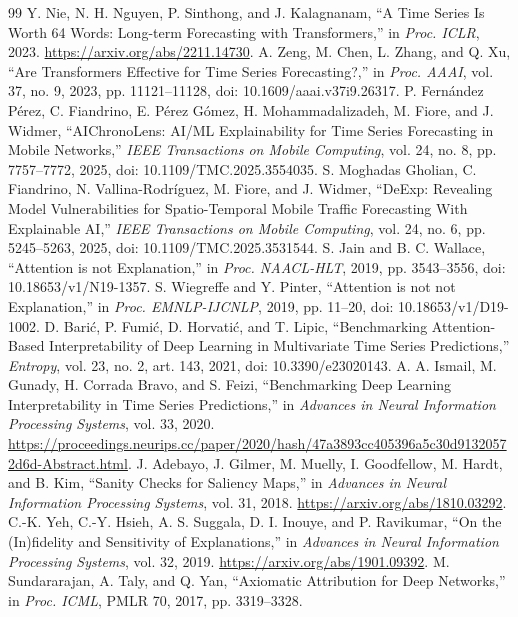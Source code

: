 \documentclass[conference]{IEEEtran}
\begin{document}
\begin{thebibliography}{99}
 Y. Nie, N. H. Nguyen, P. Sinthong, and J. Kalagnanam, ``A Time Series Is Worth 64 Words: Long-term Forecasting with Transformers,'' in \emph{Proc. ICLR}, 2023. \url{https://arxiv.org/abs/2211.14730}.
 A. Zeng, M. Chen, L. Zhang, and Q. Xu, ``Are Transformers Effective for Time Series Forecasting?,'' in \emph{Proc. AAAI}, vol. 37, no. 9, 2023, pp. 11121--11128, doi: 10.1609/aaai.v37i9.26317.
 P. Fern\'andez P\'erez, C. Fiandrino, E. P\'erez G\'omez, H. Mohammadalizadeh, M. Fiore, and J. Widmer, ``AIChronoLens: AI/ML Explainability for Time Series Forecasting in Mobile Networks,'' \emph{IEEE Transactions on Mobile Computing}, vol. 24, no. 8, pp. 7757--7772, 2025, doi: 10.1109/TMC.2025.3554035.
 S. Moghadas Gholian, C. Fiandrino, N. Vallina-Rodr\'iguez, M. Fiore, and J. Widmer, ``DeExp: Revealing Model Vulnerabilities for Spatio-Temporal Mobile Traffic Forecasting With Explainable AI,'' \emph{IEEE Transactions on Mobile Computing}, vol. 24, no. 6, pp. 5245--5263, 2025, doi: 10.1109/TMC.2025.3531544.
 S. Jain and B. C. Wallace, ``Attention is not Explanation,'' in \emph{Proc. NAACL-HLT}, 2019, pp. 3543--3556, doi: 10.18653/v1/N19-1357.
 S. Wiegreffe and Y. Pinter, ``Attention is not not Explanation,'' in \emph{Proc. EMNLP-IJCNLP}, 2019, pp. 11--20, doi: 10.18653/v1/D19-1002.
 D. Bari\'c, P. Fumi\'c, D. Horvati\'c, and T. Lipic, ``Benchmarking Attention-Based Interpretability of Deep Learning in Multivariate Time Series Predictions,'' \emph{Entropy}, vol. 23, no. 2, art. 143, 2021, doi: 10.3390/e23020143.
 A. A. Ismail, M. Gunady, H. Corrada Bravo, and S. Feizi, ``Benchmarking Deep Learning Interpretability in Time Series Predictions,'' in \emph{Advances in Neural Information Processing Systems}, vol. 33, 2020. \url{https://proceedings.neurips.cc/paper/2020/hash/47a3893cc405396a5c30d91320572d6d-Abstract.html}.
 J. Adebayo, J. Gilmer, M. Muelly, I. Goodfellow, M. Hardt, and B. Kim, ``Sanity Checks for Saliency Maps,'' in \emph{Advances in Neural Information Processing Systems}, vol. 31, 2018. \url{https://arxiv.org/abs/1810.03292}.
 C.-K. Yeh, C.-Y. Hsieh, A. S. Suggala, D. I. Inouye, and P. Ravikumar, ``On the (In)fidelity and Sensitivity of Explanations,'' in \emph{Advances in Neural Information Processing Systems}, vol. 32, 2019. \url{https://arxiv.org/abs/1901.09392}.
 M. Sundararajan, A. Taly, and Q. Yan, ``Axiomatic Attribution for Deep Networks,'' in \emph{Proc. ICML}, PMLR 70, 2017, pp. 3319--3328.

\end{thebibliography}
\end{document}
